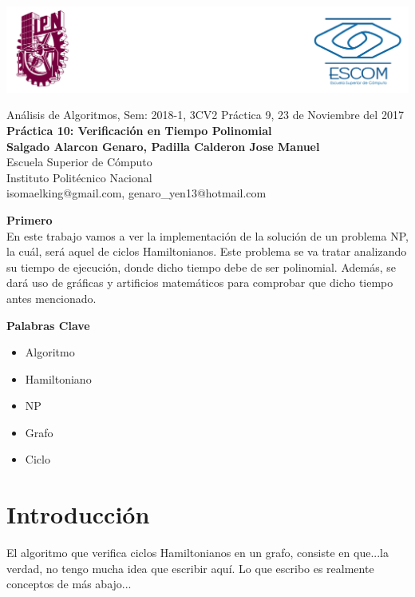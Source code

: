 \documentclass[spanish]{article}
\begin{document}
\includegraphics[width=1\textwidth, right]{./imagenes/logos.png}
	\setmarginsrb{30mm}{30mm}{30mm}{30mm}{0pt}{0mm}{0pt}{0mm}
	
	\begin{center}
	{\Large Análisis de Algoritmos, Sem: 2018-1, 3CV2 Práctica 9, 23 de Noviembre del 2017}\\
{\huge {\bf Práctica 10: Verificación en Tiempo Polinomial}} \\
{\large {\bf Salgado Alarcon Genaro, Padilla Calderon Jose Manuel}\\
Escuela Superior de Cómputo \\
Instituto Politécnico Nacional}\\
isomaelking@gmail.com, genaro\_yen13@hotmail.com\\
	\end{center}

	
	\bigskip
	
	\bigskip
	
	\bigskip
	
	{\LARGE {\bf Primero}}\\
	
	En este trabajo vamos a ver la implementación de la solución de un problema NP, la cuál, será aquel de ciclos Hamiltonianos. Este problema se va tratar analizando su tiempo de ejecución, donde dicho tiempo debe de ser polinomial. Además, se dará uso de gráficas y artificios matemáticos para comprobar que dicho tiempo antes mencionado.

	\bigskip


	{\Large {\bf Palabras Clave}}\\
	\begin{itemize}
		\item Algoritmo
		\item Hamiltoniano
		\item NP
		\item Grafo
		\item Ciclo
	\end{itemize}
	
	\section{Introducci\'on}
	El algoritmo que verifica ciclos Hamiltonianos en un grafo, consiste en que...la verdad, no tengo mucha idea que escribir aquí. Lo que escribo es realmente conceptos de más abajo...
\newpage
\end{document}
